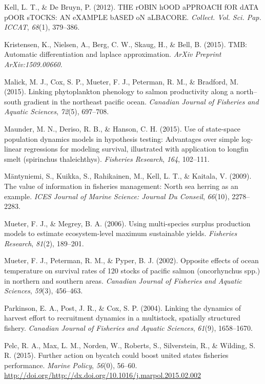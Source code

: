 \documentclass[12pt,]{scrartcl}
\begin{document}
\hypertarget{ref-kell2012robin}{}
Kell, L. T., \& De Bruyn, P. (2012). THE rOBIN hOOD aPPROACH fOR dATA
pOOR sTOCKS: AN eXAMPLE bASED oN aLBACORE. \emph{Collect. Vol. Sci. Pap.
ICCAT}, \emph{68}(1), 379--386.

\hypertarget{ref-kristensen2015tmb}{}
Kristensen, K., Nielsen, A., Berg, C. W., Skaug, H., \& Bell, B. (2015).
TMB: Automatic differentiation and laplace approximation. \emph{ArXiv
Preprint ArXiv:1509.00660}.

\hypertarget{ref-malick2015linking}{}
Malick, M. J., Cox, S. P., Mueter, F. J., Peterman, R. M., \& Bradford,
M. (2015). Linking phytoplankton phenology to salmon productivity along
a north--south gradient in the northeast pacific ocean. \emph{Canadian
Journal of Fisheries and Aquatic Sciences}, \emph{72}(5), 697--708.

\hypertarget{ref-maunder2015use}{}
Maunder, M. N., Deriso, R. B., \& Hanson, C. H. (2015). Use of
state-space population dynamics models in hypothesis testing: Advantages
over simple log-linear regressions for modeling survival, illustrated
with application to longfin smelt (spirinchus thaleichthys).
\emph{Fisheries Research}, \emph{164}, 102--111.

\hypertarget{ref-mantyniemi2009value}{}
Mäntyniemi, S., Kuikka, S., Rahikainen, M., Kell, L. T., \& Kaitala, V.
(2009). The value of information in fisheries management: North sea
herring as an example. \emph{ICES Journal of Marine Science: Journal Du
Conseil}, \emph{66}(10), 2278--2283.

\hypertarget{ref-mueter2006using}{}
Mueter, F. J., \& Megrey, B. A. (2006). Using multi-species surplus
production models to estimate ecosystem-level maximum sustainable
yields. \emph{Fisheries Research}, \emph{81}(2), 189--201.

\hypertarget{ref-mueter2002opposite}{}
Mueter, F. J., Peterman, R. M., \& Pyper, B. J. (2002). Opposite effects
of ocean temperature on survival rates of 120 stocks of pacific salmon
(oncorhynchus spp.) in northern and southern areas. \emph{Canadian
Journal of Fisheries and Aquatic Sciences}, \emph{59}(3), 456--463.

\hypertarget{ref-parkinson2004linking}{}
Parkinson, E. A., Post, J. R., \& Cox, S. P. (2004). Linking the
dynamics of harvest effort to recruitment dynamics in a multistock,
spatially structured fishery. \emph{Canadian Journal of Fisheries and
Aquatic Sciences}, \emph{61}(9), 1658--1670.

\hypertarget{ref-Pelc201556}{}
Pelc, R. A., Max, L. M., Norden, W., Roberts, S., Silverstein, R., \&
Wilding, S. R. (2015). Further action on bycatch could boost united
states fisheries performance. \emph{Marine Policy}, \emph{56}(0),
56--60.
\url{http://doi.org/http://dx.doi.org/10.1016/j.marpol.2015.02.002}
\end{document}
